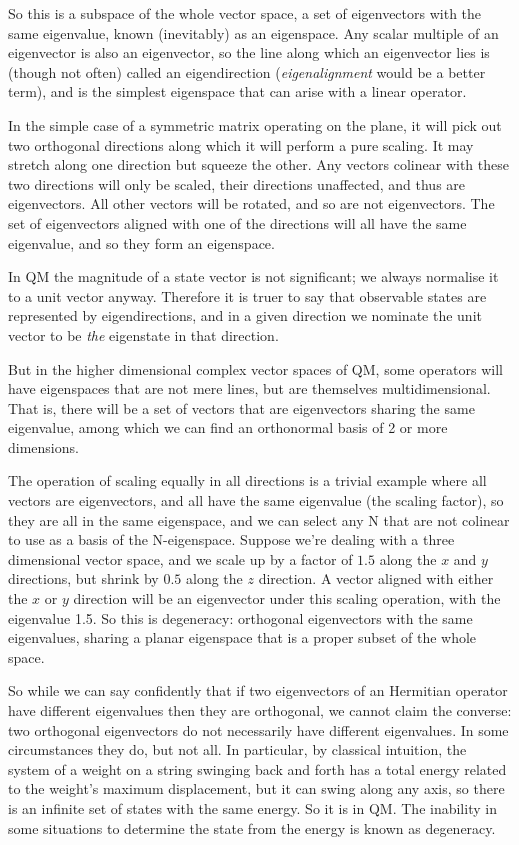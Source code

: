 So this is a subspace of the whole vector space, a set of eigenvectors with the same eigenvalue, known (inevitably) as an eigenspace. Any scalar multiple of an eigenvector is also an eigenvector, so the line along which an eigenvector lies is (though not often) called an eigendirection (\textit{eigenalignment} would be a better term), and is the simplest eigenspace that can arise with a linear operator.

In the simple case of a symmetric matrix operating on the plane, it will pick out two orthogonal directions along which it will perform a pure scaling. It may stretch along one direction but squeeze the other. Any vectors colinear with these two directions will only be scaled, their directions unaffected, and thus are eigenvectors. All other vectors will be rotated, and so are not eigenvectors. The set of eigenvectors aligned with one of the directions will all have the same eigenvalue, and so they form an eigenspace.

In QM the magnitude of a state vector is not significant; we always normalise it to a unit vector anyway. Therefore it is truer to say that observable states are represented by eigendirections, and in a given direction we nominate the unit vector to be \textit{the} eigenstate in that direction.

But in the higher dimensional complex vector spaces of QM, some operators will have eigenspaces that are not mere lines, but are themselves multidimensional. That is, there will be a set of vectors that are eigenvectors sharing the same eigenvalue, among which we can find an orthonormal basis of 2 or more dimensions.

The operation of scaling equally in all directions is a trivial example where all vectors are eigenvectors, and all have the same eigenvalue (the scaling factor), so they are all in the same eigenspace, and we can select any N that are not colinear to use as a basis of the N-eigenspace. Suppose we're dealing with a three dimensional vector space, and we scale up by a factor of $1.5$ along the $x$ and $y$ directions, but shrink by $0.5$ along the $z$ direction. A vector aligned with either the $x$ or $y$ direction will be an eigenvector under this scaling operation, with the eigenvalue 1.5. So this is degeneracy: orthogonal eigenvectors with the same eigenvalues, sharing a planar eigenspace that is a proper subset of the whole space.

So while we can say confidently that if two eigenvectors of an Hermitian operator have different eigenvalues then they are orthogonal, we cannot claim the converse: two orthogonal eigenvectors do not necessarily have different eigenvalues. In some circumstances they do, but not all. In particular, by classical intuition, the system of a weight on a string swinging back and forth has a total energy related to the weight's maximum displacement, but it can swing along any axis, so there is an infinite set of states with the same energy. So it is in QM. The inability in some situations to determine the state from the energy is known as degeneracy.

